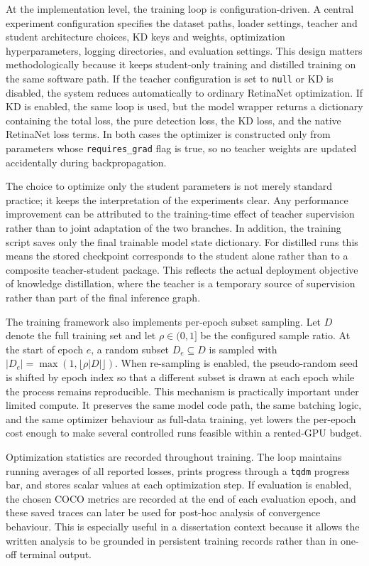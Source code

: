 At the implementation level, the training loop is configuration-driven. A central experiment configuration specifies the dataset paths, loader settings, teacher and student architecture choices, KD keys and weights, optimization hyperparameters, logging directories, and evaluation settings. This design matters methodologically because it keeps student-only training and distilled training on the same software path. If the teacher configuration is set to \texttt{null} or KD is disabled, the system reduces automatically to ordinary RetinaNet optimization. If KD is enabled, the same loop is used, but the model wrapper returns a dictionary containing the total loss, the pure detection loss, the KD loss, and the native RetinaNet loss terms. In both cases the optimizer is constructed only from parameters whose \texttt{requires\_grad} flag is true, so no teacher weights are updated accidentally during backpropagation.

The choice to optimize only the student parameters is not merely standard practice; it keeps the interpretation of the experiments clear. Any performance improvement can be attributed to the training-time effect of teacher supervision rather than to joint adaptation of the two branches. In addition, the training script saves only the final trainable model state dictionary. For distilled runs this means the stored checkpoint corresponds to the student alone rather than to a composite teacher-student package. This reflects the actual deployment objective of knowledge distillation, where the teacher is a temporary source of supervision rather than part of the final inference graph.

The training framework also implements per-epoch subset sampling. Let $D$ denote the full training set and let $\rho \in (0,1]$ be the configured sample ratio. At the start of epoch $e$, a random subset $D_e \subseteq D$ is sampled with $|D_e| = \max(1,\lfloor \rho |D| \rfloor)$. When re-sampling is enabled, the pseudo-random seed is shifted by epoch index so that a different subset is drawn at each epoch while the process remains reproducible. This mechanism is practically important under limited compute. It preserves the same model code path, the same batching logic, and the same optimizer behaviour as full-data training, yet lowers the per-epoch cost enough to make several controlled runs feasible within a rented-GPU budget.

Optimization statistics are recorded throughout training. The loop maintains running averages of all reported losses, prints progress through a \texttt{tqdm} progress bar, and stores scalar values at each optimization step. If evaluation is enabled, the chosen COCO metrics are recorded at the end of each evaluation epoch, and these saved traces can later be used for post-hoc analysis of convergence behaviour. This is especially useful in a dissertation context because it allows the written analysis to be grounded in persistent training records rather than in one-off terminal output.

